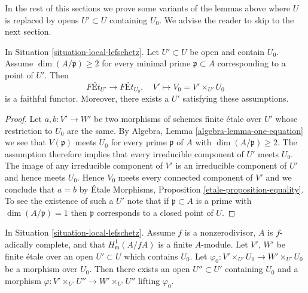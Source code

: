 \noindent
In the rest of this sections we prove some variants of the lemmas above
where $U$ is replaced by opens $U' \subset U$ containing $U_0$.
We advise the reader to skip to the next section.

\begin{lemma}
\label{lemma-faithful-general}
In Situation \ref{situation-local-lefschetz}.
Let $U' \subset U$ be open and contain $U_0$.
Assume $\dim(A/\mathfrak p) \geq 2$ for every minimal prime
$\mathfrak p \subset A$ corresponding to a point of $U'$. Then
$$
\textit{F\'Et}_{U'} \longrightarrow \textit{F\'Et}_{U_0},\quad
V' \longmapsto V_0 = V' \times_{U'} U_0
$$
is a faithful functor. Moreover, there exists a $U'$ satisfying
these assumptions.
\end{lemma}

\begin{proof}
Let $a, b : V' \to W'$ be two morphisms of schemes finite \'etale
over $U'$ whose restriction to $U_0$ are the same. By
Algebra, Lemma \ref{algebra-lemma-one-equation}
we see that $V(\mathfrak p)$ meets $U_0$ for
every prime $\mathfrak p$ of $A$ with $\dim(A/\mathfrak p) \geq 2$.
The assumption therefore implies that every
irreducible component of $U'$ meets $U_0$.
The image of any irreducible component of $V'$ is an
irreducible component of $U'$ and hence meets $U_0$.
Hence $V_0$ meets every connected component of $V'$ and
we conclude that $a = b$ by \'Etale Morphisms, Proposition
\ref{etale-proposition-equality}.
To see the existence of such a $U'$ note that if
$\mathfrak p \subset A$ is a prime with $\dim(A/\mathfrak p) = 1$
then $\mathfrak p$ corresponds to a closed point of $U$.
\end{proof}

\begin{lemma}
\label{lemma-fully-faithful-general}
In Situation \ref{situation-local-lefschetz}.
Assume $f$ is a nonzerodivisor, $A$ is $f$-adically complete, and that
$H^1_\mathfrak m(A/fA)$ is a finite $A$-module.
Let $V'$, $W'$ be finite \'etale over an open $U' \subset U$
which contains $U_0$. Let
$\varphi_0 : V' \times_{U'} U_0 \to W' \times_{U'} U_0$
be a morphism over $U_0$.
Then there exists an open $U'' \subset U'$
containing $U_0$ and a morphism
$\varphi : V' \times_{U'} U'' \to W' \times_{U'} U''$
lifting $\varphi_0$.
\end{lemma}

